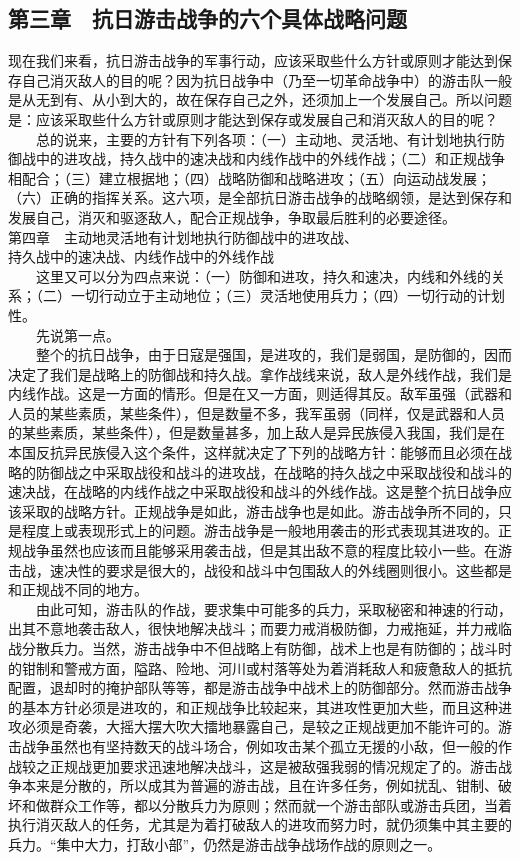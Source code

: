 \documentclass[cn,11pt,chinese]{elegantbook}
\def\myformat#1{\hfil\hfil #1}
\begin{document}
\subsection*{\myformat{第三章　抗日游击战争的六个具体战略问题}}
现在我们来看，抗日游击战争的军事行动，应该采取些什么方针或原则才能达到保存自己消灭敌人的目的呢？因为抗日战争中（乃至一切革命战争中）的游击队一般是从无到有、从小到大的，故在保存自己之外，还须加上一个发展自己。所以问题是：应该采取些什么方针或原则才能达到保存或发展自己和消灭敌人的目的呢？\\
　　总的说来，主要的方针有下列各项：（一）主动地、灵活地、有计划地执行防御战中的进攻战，持久战中的速决战和内线作战中的外线作战；（二）和正规战争相配合；（三）建立根据地；（四）战略防御和战略进攻；（五）向运动战发展；（六）正确的指挥关系。这六项，是全部抗日游击战争的战略纲领，是达到保存和发展自己，消灭和驱逐敌人，配合正规战争，争取最后胜利的必要途径。\\
第四章　主动地灵活地有计划地执行防御战中的进攻战、\\
持久战中的速决战、内线作战中的外线作战\\
　　这里又可以分为四点来说：（一）防御和进攻，持久和速决，内线和外线的关系；（二）一切行动立于主动地位；（三）灵活地使用兵力；（四）一切行动的计划性。\\
　　先说第一点。\\
　　整个的抗日战争，由于日寇是强国，是进攻的，我们是弱国，是防御的，因而决定了我们是战略上的防御战和持久战。拿作战线来说，敌人是外线作战，我们是内线作战。这是一方面的情形。但是在又一方面，则适得其反。敌军虽强（武器和人员的某些素质，某些条件），但是数量不多，我军虽弱（同样，仅是武器和人员的某些素质，某些条件），但是数量甚多，加上敌人是异民族侵入我国，我们是在本国反抗异民族侵入这个条件，这样就决定了下列的战略方针：能够而且必须在战略的防御战之中采取战役和战斗的进攻战，在战略的持久战之中采取战役和战斗的速决战，在战略的内线作战之中采取战役和战斗的外线作战。这是整个抗日战争应该采取的战略方针。正规战争是如此，游击战争也是如此。游击战争所不同的，只是程度上或表现形式上的问题。游击战争是一般地用袭击的形式表现其进攻的。正规战争虽然也应该而且能够采用袭击战，但是其出敌不意的程度比较小一些。在游击战，速决性的要求是很大的，战役和战斗中包围敌人的外线圈则很小。这些都是和正规战不同的地方。\\
　　由此可知，游击队的作战，要求集中可能多的兵力，采取秘密和神速的行动，出其不意地袭击敌人，很快地解决战斗；而要力戒消极防御，力戒拖延，并力戒临战分散兵力。当然，游击战争中不但战略上有防御，战术上也是有防御的；战斗时的钳制和警戒方面，隘路、险地、河川或村落等处为着消耗敌人和疲惫敌人的抵抗配置，退却时的掩护部队等等，都是游击战争中战术上的防御部分。然而游击战争的基本方针必须是进攻的，和正规战争比较起来，其进攻性更加大些，而且这种进攻必须是奇袭，大摇大摆大吹大擂地暴露自己，是较之正规战更加不能许可的。游击战争虽然也有坚持数天的战斗场合，例如攻击某个孤立无援的小敌，但一般的作战较之正规战更加要求迅速地解决战斗，这是被敌强我弱的情况规定了的。游击战争本来是分散的，所以成其为普遍的游击战，且在许多任务，例如扰乱、钳制、破坏和做群众工作等，都以分散兵力为原则；然而就一个游击部队或游击兵团，当着执行消灭敌人的任务，尤其是为着打破敌人的进攻而努力时，就仍须集中其主要的兵力。“集中大力，打敌小部”，仍然是游击战争战场作战的原则之一。\\
\end{document}
